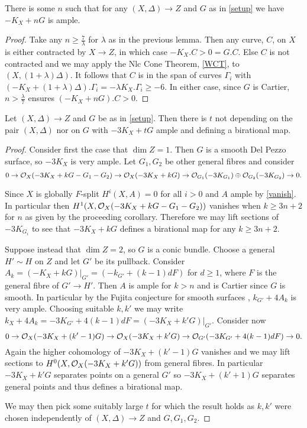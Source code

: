 	\begin{corollary}\label{nAmple}
	There is some $n$ such that for any $(X,\Delta) \to Z$ and $G$ as in \autoref{setup} we have $-K_{X}+nG$ is ample.
\end{corollary}


\begin{proof}
	Take any $n \geq \frac{7}{\lambda}$ for $\lambda$ as in the previous lemma. Then any curve, $C$, on $X$ is either contracted by $X \to Z$, in which case $-K_{X}.C>0=G.C$. Else $C$ is not contracted and we may apply the Nlc Cone Theorem, \autoref{WCT}, to $(X,(1+\lambda)\Delta)$. It follows that $C$ is in the span of curves $\Gamma_{i}$ with $(-K_{X}+(1+\lambda)\Delta).\Gamma_{i} = -\lambda K_{X}.\Gamma_{i} \geq -6$. In either case, since $G$ is Cartier, $n> \frac{\lambda}{7}$ ensures $(-K_{X}+nG).C >0$.
\end{proof}

\begin{theorem}
	Let $(X,\Delta) \to Z$ and $G$ be as in \autoref{setup}. Then there is $t$ not depending on the pair $(X,\Delta)$ nor on $G$ with $-3K_{X}+tG$ ample and defining a birational map. 
\end{theorem}
\begin{proof}
	Consider first the case that $\dim Z=1$. Then $G$ is a smooth Del Pezzo surface, so $-3K_{X}$ is very ample. Let $G_{1},G_{2}$ be other general fibres and consider
	\[0 \to \mathcal{O}_{X}(-3K_{X}+kG-G_{1}-G_{2}) \to \mathcal{O}_{X}(-3K_{X}+kG) \to \mathcal{O}_{G_{1}}(-3K_{G_{1}})\oplus \mathcal{O}_{G_{2}}(-3K_{G_{2}}) \to 0.\]
	
	Since $X$ is globally $F$-split $H^{i}(X,A)=0$ for all $i>0$ and $A$ ample by \autoref{vanish}. In particular then $H^{1}(X,\mathcal{O}_{X}(-3K_{X}+kG-G_{1}-G_{2}))$ vanishes when $k\geq 3n+2$ for $n$ as given by the proceeding corollary. Therefore we may lift sections of $-3K_{G_{i}}$ to see that $-3K_{X}+kG$ defines a birational map for any $k \geq 3n+2$. 

	Suppose instead that $\dim Z=2$, so $G$ is a conic bundle. Choose a general $H'\sim H$ on $Z$ and let $G'$ be its pullback. Consider $A_{k}=(-K_{X}+kG)|_{G'}=(-k_{G'}+(k-1)dF)$ for $d \geq 1$, where $F$ is the general fibre of $G'\to H'$. Then $A$ is ample for $k >n$ and is Cartier since $G$ is smooth. In particular by the Fujita conjecture for smooth surfaces \cite[Corollary 2.5]{terakawa1999d}, $k_{G'}+4A_{k}$ is very ample. Choosing suitable $k,k'$ we may write $k_{X}+4A_{k}=-3K_{G'}+4(k-1)dF=(-3K_{X}+k'G)|_{G'}$. Consider now
	\[0 \to \mathcal{O}_{X}(-3K_{X}+(k'-1)G)\to \mathcal{O}_{X}(-3K_{X}+k'G)\to \mathcal{O}_{G'}(-3K_{G'}+4(k-1)dF) \to 0.\]
	Again the higher cohomology of $-3K_{X}+(k'-1)G$ vanishes and we may lift sections to $H^{0}(X,\mathcal{O}_{X}(-3K_{X}+k'G))$ from general fibres. In particular $-3K_{X}+k'G$ separates points on a general $G'$ so $-3K_{X}+(k'+1)G$ separates general points and thus defines a birational map. 

	We may then pick some suitably large $t$ for which the result holds as $k,k'$ were chosen independently of $(X,\Delta) \to Z$ and $G,G_{1},G_{2}$.
\end{proof}

